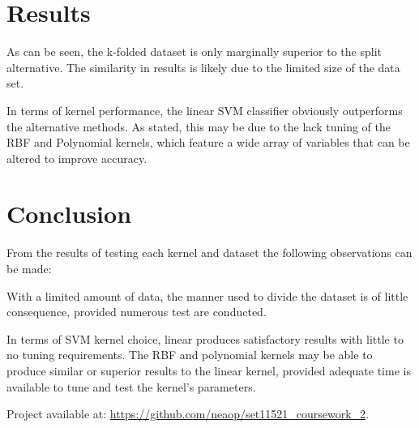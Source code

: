 \documentclass[twocolumn]{article}
\begin{document}
\section{Results}
As can be seen, the k-folded dataset is only marginally superior to the split
alternative.
The similarity in results is likely due to the limited size of the data set.

In terms of kernel performance, the linear SVM classifier obviously
outperforms the alternative methods.
As stated, this may be due to the lack tuning of the RBF and Polynomial
kernels, which feature a wide array of variables that can be altered to
improve accuracy.


\section{Conclusion}
From the results of testing each kernel and dataset the following observations
can be made:

With a limited amount of data, the manner used to divide the dataset is of
little consequence, provided numerous test are conducted.

In terms of SVM kernel choice, linear produces satisfactory results with little
to no tuning requirements.
The RBF and polynomial kernels may be able to produce similar or superior
results to the linear kernel, provided adequate time is available to tune
and test the kernel's parameters.

\noindent
Project available at: \url{https://github.com/neaop/set11521_coursework_2}.



\nocite{*}
\end{document}
